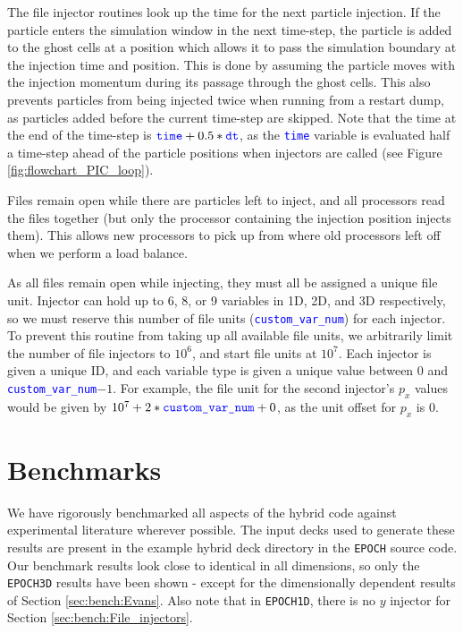 \documentclass[12pt]{article}
\numberwithin{equation}{section}
\begin{document}
The file injector routines look up the time for the next particle injection. If the particle enters the simulation window in the next time-step, the particle is added to the ghost cells at a position which allows it to pass the simulation boundary at the injection time and position. This is done by assuming the particle moves with the injection momentum during its passage through the ghost cells. This also prevents particles from being injected twice when running from a restart dump, as particles added before the current time-step are skipped.  Note that the time at the end of the time-step is $\text{\textcolor{blue}{\texttt{time}}}+0.5*\text{\textcolor{blue}{\texttt{dt}}}$, as the \textcolor{blue}{\texttt{time}} variable is evaluated half a time-step ahead of the particle positions when injectors are called (see Figure \ref{fig:flowchart_PIC_loop}).

Files remain open while there are particles left to inject, and all processors read the files together (but only the processor containing the injection position injects them). This allows new processors to pick up from where old processors left off when we perform a load balance.

As all files remain open while injecting, they must all be assigned a unique file unit. Injector can hold up to 6, 8, or 9 variables in 1D, 2D, and 3D respectively, so we must reserve this number of file units (\textcolor{blue}{\texttt{custom\_var\_num}}) for each injector. To prevent this routine from taking up all available file units, we arbitrarily limit the number of file injectors to $10^6$, and start file units at $10^7$. Each injector is given a unique ID, and each variable type is given a unique value between 0 and \textcolor{blue}{\texttt{custom\_var\_num}}$-1$. For example, the file unit for the second injector's $p_x$ values would be given by $10^7 + 2*\text{\textcolor{blue}{\texttt{custom\_var\_num}}} + 0$, as the unit offset for $p_x$ is 0.

\section{Benchmarks} \label{sec:bench}

We have rigorously benchmarked all aspects of the hybrid code against experimental literature wherever possible. The input decks used to generate these results are present in the example hybrid deck directory in the \texttt{EPOCH} source code. Our benchmark results look close to identical in all dimensions, so only the \texttt{EPOCH3D} results have been shown - except for the dimensionally dependent results of Section \ref{sec:bench:Evans}. Also note that in \texttt{EPOCH1D}, there is no $y$ injector for Section \ref{sec:bench:File_injectors}.
\end{document}

